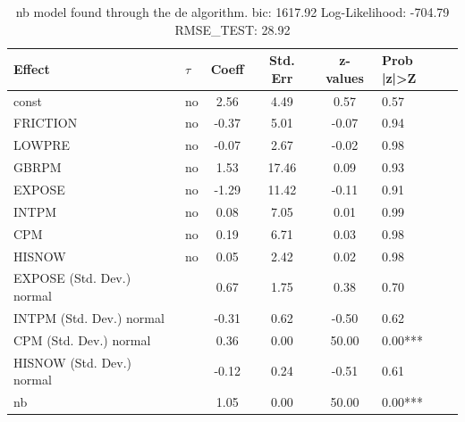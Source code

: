\begin{table}
	\caption{nb model found through the de algorithm. bic: 1617.92 Log-Likelihood: -704.79 RMSE_TEST: 28.92}
	\begin{center}
		\begin{tabular}{|l|l|c|c|c|l|}
			\hline
			Effect & $\tau$ & Coeff & Std. Err & z-values & Prob |z|>Z \\
			\hline
			const & no & 2.56 & 4.49 & 0.57 & 0.57 \\
			\hline
			FRICTION & no & -0.37 & 5.01 & -0.07 & 0.94 \\
			\hline
			LOWPRE & no & -0.07 & 2.67 & -0.02 & 0.98 \\
			\hline
			GBRPM & no & 1.53 & 17.46 & 0.09 & 0.93 \\
			\hline
			EXPOSE & no & -1.29 & 11.42 & -0.11 & 0.91 \\
			\hline
			INTPM & no & 0.08 & 7.05 & 0.01 & 0.99 \\
			\hline
			CPM & no & 0.19 & 6.71 & 0.03 & 0.98 \\
			\hline
			HISNOW & no & 0.05 & 2.42 & 0.02 & 0.98 \\
			\hline
			EXPOSE (Std. Dev.) normal &  & 0.67 & 1.75 & 0.38 & 0.70 \\
			\hline
			INTPM (Std. Dev.) normal &  & -0.31 & 0.62 & -0.50 & 0.62 \\
			\hline
			CPM (Std. Dev.) normal &  & 0.36 & 0.00 & 50.00 & 0.00*** \\
			\hline
			HISNOW (Std. Dev.) normal &  & -0.12 & 0.24 & -0.51 & 0.61 \\
			\hline
			nb &  & 1.05 & 0.00 & 50.00 & 0.00*** \\
			\hline
		\end{tabular}
	\end{center}
\end{table}